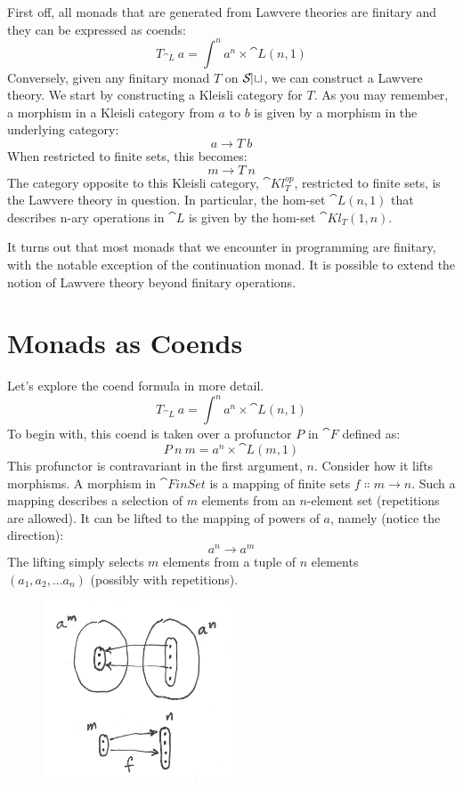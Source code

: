 First off, all monads that are generated from Lawvere theories are
finitary and they can be expressed as coends:
\[T_{\cat{L}}\ a = \int^n a^n \times \cat{L}(n, 1)\]
Conversely, given any finitary monad $T$ on $\mathcal{S\mkern-3mu et}$, we can
construct a Lawvere theory. We start by constructing a Kleisli category
for $T$. As you may remember, a morphism in a Kleisli category
from $a$ to $b$ is given by a morphism in the underlying
category:
\[a \to T\ b\]
When restricted to finite sets, this becomes:
\[m \to T\ n\]
The category opposite to this Kleisli category,
$\cat{Kl}^{op}_{T}$, restricted to finite
sets, is the Lawvere theory in question. In particular, the hom-set
$\cat{L}(n, 1)$ that describes n-ary operations in $\cat{L}$ is given
by the hom-set $\cat{Kl}_{T}(1, n)$.

It turns out that most monads that we encounter in programming are
finitary, with the notable exception of the continuation monad. It is
possible to extend the notion of Lawvere theory beyond finitary
operations.

\section{Monads as Coends}

Let's explore the coend formula in more detail.
\[T_{\cat{L}}\ a = \int^n a^n \times \cat{L}(n, 1)\]
To begin with, this coend is taken over a profunctor $P$ in
$\cat{F}$ defined as:
\[P\ n\ m = a^n \times \cat{L}(m, 1)\]
This profunctor is contravariant in the first argument, $n$.
Consider how it lifts morphisms. A morphism in $\cat{FinSet}$ is a
mapping of finite sets $f \Colon m \to n$. Such a
mapping describes a selection of $m$ elements from an $n$-element set
(repetitions are allowed). It can be lifted to the mapping of powers of
$a$, namely (notice the direction):
\[a^n \to a^m\]
The lifting simply selects $m$ elements from a tuple of $n$ elements\\
$(a_1, a_2,...a_n)$ (possibly with repetitions).

\begin{figure}[H]
\centering
\includegraphics[width=0.5\textwidth]{images/liftpower.png}
\end{figure}

